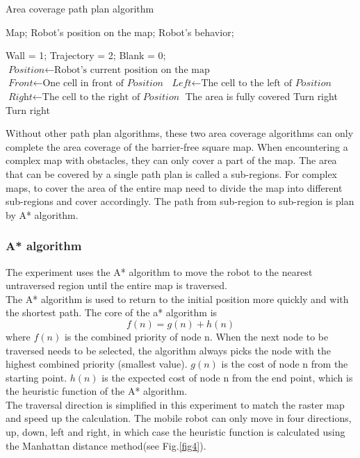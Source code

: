 \documentclass[conference]{IEEEtran}
\begin{document}
\begin{algorithm}[h]
 \caption{Area coverage path plan algorithm}
 \label{alg.l1}
 \begin{algorithmic}[1]
 \Require
 Map; Robot's position on the map;
 \Ensure
 Robot's behavior;
 
    \STATE Wall = 1;
    \STATE Trajectory = 2;
    \STATE Blank = 0;
    \STATE $\textit{Position} \gets \text{Robot's current position on the map}$
    \STATE $\textit{Front} \gets \text{One cell in front of } \textit{Position}$
    \STATE $\textit{Left} \gets \text{The cell to the left of } \textit{Position}$
    \STATE $\textit{Right} \gets \text{The cell to the right of } \textit{Position}$
    {
            {
                {The area is fully covered}
            {\ELSE}
                {Turn right}
            \ENDIF
        {
            {Turn right}}
        \ENDIF}
  \ENDIF}
  \label{code:recentEnd}
 \end{algorithmic}
\end{algorithm}

Without other path plan algorithms, these two area coverage algorithms can only complete the area coverage of the barrier-free square map. When encountering a complex map with obstacles, they can only cover a part of the map. The area that can be covered by a single path plan is called a sub-regions. For complex maps, to cover the area of the entire map need to divide the map into different sub-regions and cover accordingly. The path from sub-region to sub-region is plan by A* algorithm.

\subsubsection{A* algorithm}
The experiment uses the A* algorithm to move the robot to the nearest untraversed region until the entire map is traversed.\\
The A* algorithm\cite{hart1968formal} is used to return to the initial position more quickly and with the shortest path. The core of the a* algorithm is
\begin{equation}
  f(n) = g(n) + h(n)
\end{equation}
where $f(n)$ is the combined priority of node n. When the next node to be traversed needs to be selected, the algorithm always picks the node with the highest combined priority (smallest value). $g(n)$ is the cost of node n from the starting point. $h(n)$ is the expected cost of node n from the end point, which is the heuristic function of the A* algorithm.\\
The traversal direction is simplified in this experiment to match the raster map and speed up the calculation. The mobile robot can only move in four directions, up, down, left and right, in which case the heuristic function is calculated using the Manhattan distance method(see Fig.\ref{fig4}).
\end{document}
